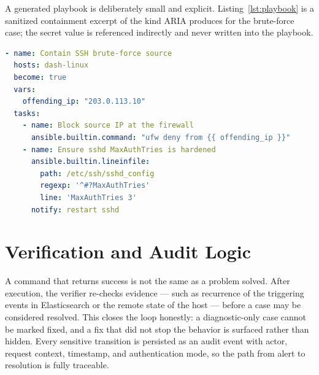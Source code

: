 

A generated playbook is deliberately small and explicit. Listing~\ref{lst:playbook} is a sanitized containment excerpt of the kind ARIA produces for the brute-force case; the secret value is referenced indirectly and never written into the playbook.

\begin{lstlisting}[style=aria,language=yaml,caption={Sanitized remediation playbook excerpt (containment phase)},label={lst:playbook}]
- name: Contain SSH brute-force source
  hosts: dash-linux
  become: true
  vars:
    offending_ip: "203.0.113.10"
  tasks:
    - name: Block source IP at the firewall
      ansible.builtin.command: "ufw deny from {{ offending_ip }}"
    - name: Ensure sshd MaxAuthTries is hardened
      ansible.builtin.lineinfile:
        path: /etc/ssh/sshd_config
        regexp: '^#?MaxAuthTries'
        line: 'MaxAuthTries 3'
      notify: restart sshd
\end{lstlisting}

\section{Verification and Audit Logic}

A command that returns success is not the same as a problem solved. After execution, the verifier re-checks evidence --- such as recurrence of the triggering events in Elasticsearch or the remote state of the host --- before a case may be considered resolved. This closes the loop honestly: a diagnostic-only case cannot be marked fixed, and a fix that did not stop the behavior is surfaced rather than hidden. Every sensitive transition is persisted as an audit event with actor, request context, timestamp, and authentication mode, so the path from alert to resolution is fully traceable.


